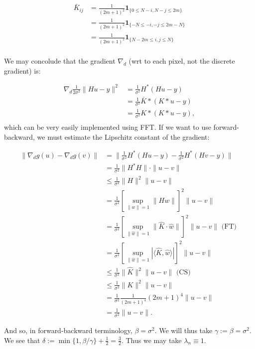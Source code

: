 \documentclass[paper=a4, fontsize=11pt]{scrartcl} %
\numberwithin{equation}{section} %
\numberwithin{figure}{section} %
\numberwithin{table}{section} %
\newcommand{\grad}{\nabla_{d} }
\begin{document}
\begin{align*}
  \bar{K}_{ij} &= \frac{1}{ (2m+1)^2 } \mathbf{1}_{\{ 0 \leq N-i,N-j \leq 2m \} } \\
  &= \frac{1}{ (2m+1)^2 } \mathbf{1}_{\{ -N \leq -i,-j \leq 2m -N\} } \\
  &= \frac{1}{ (2m+1)^2 } \mathbf{1}_{\{ N-2m \leq i,j \leq N \} } \\
\end{align*}

We may concolude that the gradient $\grad$ (wrt to each pixel, not
the discrete gradient) is:

\begin{align*}
  \grad \frac{1}{2\sigma^2} \|Hu - y\|^2 &= \frac{1}{\sigma^2} H^{*}(Hu -y ) \\
  &= \frac{1}{\sigma^2} \bar{K} * (K*u - y)\\
  &= \frac{1}{\sigma^2} K * (K*u - y),\\
\end{align*}
which can be very easily implemented using FFT. If we want to use
forward-backward, we must estimate the Lipschitz constant of the
gradient:

\begin{align*}
  \|\grad g(u) - \grad g(v)\| &= \|\frac{1}{\sigma^2} H^{*}(Hu - y ) - \frac{1}{\sigma^2}H^{*}(Hv - y)\| \\
  &=\frac{1}{\sigma^2}\|H^{*}H\| \cdot \|u-v\|\\
  &\leq \frac{1}{\sigma^2}\|H\|^2 \|u-v\| \\
  &= \frac{1}{\sigma^2} [\sup_{\|w\| = 1} \|Hw\|]^2 \|u-v\| \\
  &= \frac{1}{\sigma^2} [\sup_{\|\hat{w}\| = 1} \|\hat{K} \cdot \hat{w}\|]^2 \|u-v\| \text{ (FT) }\\
  &= \frac{1}{\sigma^2} [\sup_{\|\hat{w}\| = 1} |\langle \hat{K},  \hat{w}\rangle|]^2 \|u-v\| \\
  &\leq \frac{1}{\sigma^2} \|\hat{K}\|^2 \|u-v\| \text{ (CS) }\\
  &\leq \frac{1}{\sigma^2} \|K\|^2 \|u-v\|\\
  &=\frac{1}{\sigma^2} \frac{1}{(2m+1)^4} (2m+1)^4 \|u-v\| \\
  &= \frac{1}{\sigma^2} \|u-v\|.
\end{align*}

And so, in forward-backward terminology, $\beta = \sigma^2$. We will
thus take $\gamma :=\beta = \sigma^2$.  We see that $\delta := \min
\{1, \beta / \gamma \} + \frac{1}{2} = \frac{3}{2}$. Thus we may take
$\lambda_n \equiv 1$.
\end{document}
